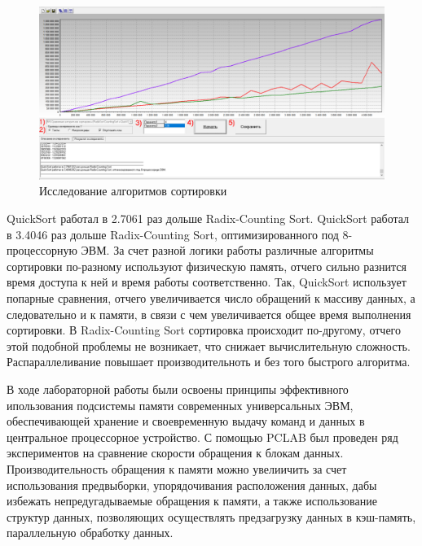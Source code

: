 \begin{figure}[H]
	\begin{center}
		\includegraphics[scale=0.5]{assets/task8.png}
	\end{center}
	\caption{Исследование алгоритмов сортировки}
\end{figure}

QuickSort работал в 2.7061 раз дольше Radix-Counting Sort. QuickSort работал в 3.4046 раз дольше Radix-Counting Sort, оптимизированного под 8-процессорную ЭВМ. За счет разной логики работы различные алгоритмы сортировки по-разному используют физическую память, отчего сильно разнится время доступа к ней и время работы соответственно. Так, QuickSort использует попарные сравнения, отчего увеличивается число обращений к массиву данных, а следовательно и к памяти, в связи с чем увеличивается общее время выполнения сортировки. В Radix-Counting Sort сортировка происходит по-другому, отчего этой подобной проблемы не возникает, что снижает вычислительную сложность. Распараллеливание повышает производительноть и без того быстрого алгоритма.


В ходе лабораторной работы были освоены принципы эффективного ипользования подсистемы памяти современных универсальных ЭВМ, обеспечивающей хранение и своевременную выдачу команд и данных в центральное процессорное устройство. С помощью PCLAB был проведен ряд экспериментов на сравнение скорости обращения к блокам данных. Производительность обращения к памяти можно увелиичить за счет использования предвыборки, упорядочивания расположения данных, дабы избежать непредугадываемые обращения к памяти, а также использование структур данных, позволяющих осуществлять предзагрузку данных в кэш-память, параллельную обработку данных.